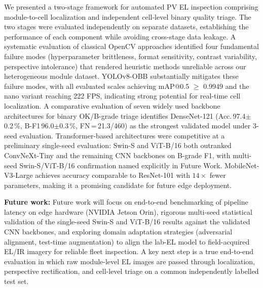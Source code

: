 \documentclass[conference]{IEEEtran}
\begin{document}
We presented a two-stage framework for automated PV EL inspection comprising module-to-cell localization and independent cell-level binary quality triage. The two stages were evaluated independently on separate datasets, establishing the performance of each component while avoiding cross-stage data leakage. A systematic evaluation of classical OpenCV approaches identified four fundamental failure modes (hyperparameter brittleness, format sensitivity, contrast variability, perspective intolerance) that rendered heuristic methods unreliable across our heterogeneous module dataset. YOLOv8-OBB substantially mitigates these failure modes, with all evaluated scales achieving mAP@0.5 $\geq$ 0.9949 and the nano variant reaching 222 FPS, indicating strong potential for real-time cell localization. A comparative evaluation of seven widely used backbone architectures for binary OK/B-grade triage identifies DenseNet-121 (Acc.\,97.4$\pm$0.2\,\%, B-F1\,96.0$\pm$0.3\,\%, FN\,=\,21.3/460) as the strongest validated model under 3-seed evaluation. Transformer-based architectures were competitive at a preliminary single-seed evaluation: Swin-S and ViT-B/16 both outranked ConvNeXt-Tiny and the remaining CNN backbones on B-grade F1, with multi-seed Swin-S/ViT-B/16 confirmation named explicitly in Future Work. MobileNet-V3-Large achieves accuracy comparable to ResNet-101 with $14\times$ fewer parameters, making it a promising candidate for future edge deployment.

\textbf{Future work:} Future work will focus on end-to-end benchmarking of pipeline latency on edge hardware (NVIDIA Jetson Orin), rigorous multi-seed statistical validation of the single-seed Swin-S and ViT-B/16 results against the validated CNN backbones, and exploring domain adaptation strategies (adversarial alignment, test-time augmentation) to align the lab-EL model to field-acquired EL/IR imagery for reliable fleet inspection. A key next step is a true end-to-end evaluation in which raw module-level EL images are passed through localization, perspective rectification, and cell-level triage on a common independently labelled test set.

{\small


}
\end{document}
